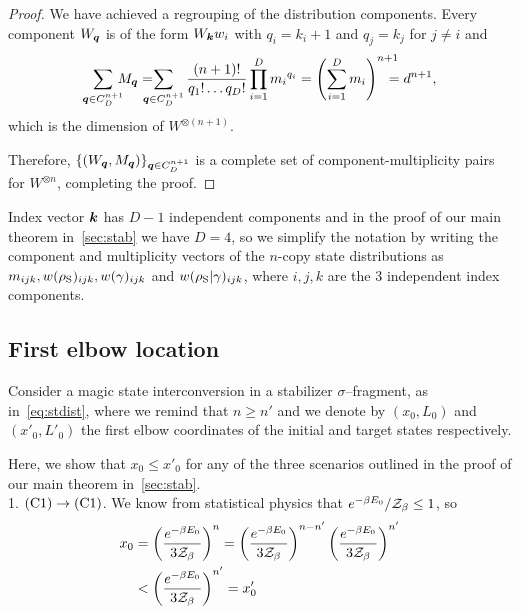 \begin{proof}
We have achieved a regrouping of the distribution components.
Every component $W_{\bm{q}}$ is of the form $W_{\bm{k}} w_i$ with $q_i = k_i + 1$ and $q_j = k_j$ for $j\neq i$ and 
\begin{align*}
	\sum_{\bmq \in C_D^{n+1}}  \hspace{-6pt} M_{\bmq} =  \hspace{-10pt} \sum_{\bmq \in C_D^{n+1}} \frac{(n+1)!}{q_1!\dots q_D!} \prod\limits_{i=1}^D {m_i}^{q_i} = 
	\left( \sum_{i=1}^D m_i \right)^{n+1} \hspace{-10pt} = d^{n+1},
\end{align*}
which is the dimension of $W^{\otimes (n+1)}$.

Therefore, $\{ (W_{\bm{q}}, M_{\bm{q}}) \}_{\bm{q} \in C_D^{n+1}}$ is a complete set of component-multiplicity pairs for $W^{\otimes n}$, completing the proof.
\end{proof}

Index vector $\bm{k}$ has $D-1$ independent components and in the proof of our main theorem in~\cref{sec:stab} we have $D=4$, so we simplify the notation by writing the component and multiplicity vectors of the $n$-copy state distributions as $m_{ijk}, w(\rho_{\rm{S}})_{ijk}, w(\gamma)_{ijk}$ and $w(\rho_{\rm{S}}|\gamma)_{ijk}$, where $i,j,k$ are the 3 independent index components.

\subsection{First elbow location}
\label{app:first_elb_loc}
Consider a magic state interconversion in a stabilizer $\sigma$--fragment, as in~\cref{eq:stdist}, where we remind that $n \geq n'$ and we denote by $(x_0, L_0)$ and $(x'_0, L'_0)$ the first elbow coordinates of the initial and target states respectively.

Here, we show that $x_0 \leq x'_0$ for any of the three scenarios outlined in the proof of our main theorem in~\cref{sec:stab}.\\

1. $\rm{(C1)} \rightarrow \rm{(C1)}$.
We know from statistical physics that $e^{-\beta E_0} / \mathcal{Z}_\beta \leq 1$, so
	\begin{align*}
		x_0 &= \left(\dfrac{e^{-\beta E_0}}{3\mathcal{Z}_\beta}\right)^n = \left(\dfrac{e^{-\beta E_0}}{3\mathcal{Z}_\beta}\right)^{n-n'} \left(\dfrac{e^{-\beta E_0}}{3\mathcal{Z}_\beta}\right)^{n'} \\
		&< \left(\dfrac{e^{-\beta E_0}}{3\mathcal{Z}_\beta}\right)^{n'} = x_0'		
	\end{align*}

